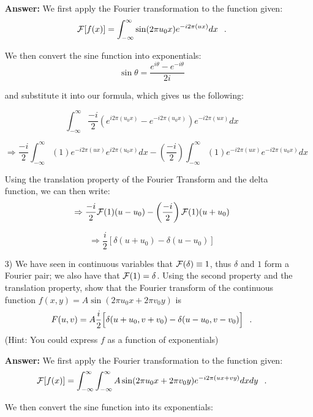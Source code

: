 \documentclass{article}
\begin{document}
\begin{enumerate}
\textbf{Answer: }We first apply the Fourier transformation to the function given:
$${\cal F}[f(x)] = \int_{-\infty}^{\infty} \sin(2\pi u_0 x) e^{-i2\pi (ux)} dx \hspace{0.1in}.$$

We then convert the sine function into exponentials:
$$\sin\theta = \frac{e^{i\theta} - e^{-i\theta}}{2i}$$

and substitute it into our formula, which gives us the following:

\begin{equation}
\int_{-\infty}^{\infty} \frac{-i}{2} \left( e^{i2\pi (u_0 x)} - e^{-i2\pi (u_0 x)}\right) e^{-i2\pi (ux)} dx
\end{equation}

\begin{equation}
\Rightarrow \frac{-i}{2} \int_{-\infty}^{\infty} (1) e^{-i2\pi (ux)} e^{i2\pi (u_0 x)} dx - \left( \frac{-i}{2}\right) \int_{-\infty}^{\infty} (1) e^{-i2\pi (ux)} e^{-i2\pi (u_0 x)} dx
\end{equation}

Using the translation property of the Fourier Transform and the delta function, we can then write:
\begin{equation}
\Rightarrow \frac{-i}{2} {\cal F}(1) (u - u_0) - \left( \frac{-i}{2} \right) {\cal F} (1) (u + u_0)
\end{equation}

\begin{equation}
\Rightarrow \frac{i}{2} \left[ \delta(u + u_0) - \delta(u - u_0) \right]
\end{equation}

\item[3)] We have seen in continuous variables that ${\cal F}(\delta)\equiv 1$, thus $\delta$ and $1$ form a Fourier pair; we also have that 
${\cal F}(1)=\delta$. Using the second property and the translation property, show that the Fourier transform of the continuous function $f(x,y)=A\sin(2\pi u_0 x+2\pi v_0y)$ is 
$$F(u,v)=A\frac{i}{2}\Big[\delta(u+u_0,v+v_0)-\delta(u-u_0,v-v_0)\Big] \hspace{0.1in}.$$ 
(Hint: You could express $f$ as a function of exponentials)

\textbf{Answer: }We first apply the Fourier transformation to the function given:
$${\cal F}[f(x)] = \int_{-\infty}^{\infty} \int_{-\infty}^{\infty} A\sin(2\pi u_0 x + 2\pi v_0 y) e^{-i2\pi (ux + vy)} dx dy\hspace{0.1in}.$$

We then convert the sine function into its exponentials:


\end{enumerate}
\end{document}
